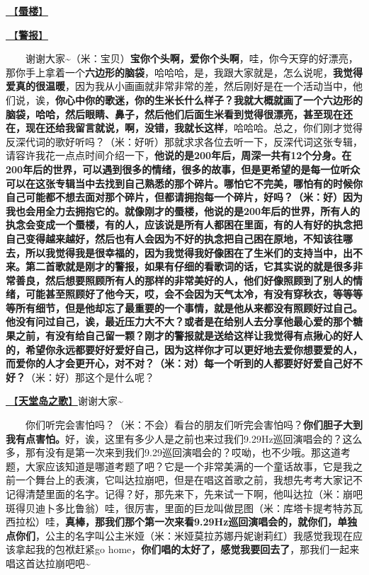 \documentclass[]{ctexbook}
\begin{document}
\hyperref[mirage]{🎵【\textbf{蜃楼}】}

\hyperref[the-giver]{🎵【\textbf{警报}】}

  谢谢大家\textasciitilde（米：宝贝）\textbf{宝你个头啊，爱你个头啊}，哇，你今天穿的好漂亮，那你手上拿着一个\textbf{六边形的脑袋}，哈哈哈，是，我跟大家就是，怎么说呢，\textbf{我觉得爱真的很温暖}，因为我从小画画就非常非常的差，然后刚好是在一个活动当中，他们说，诶，\textbf{你心中你的歌迷，你的生米长什么样子？我就大概就画了一个六边形的脑袋，哈哈，然后眼睛、鼻子，然后他们后面生米看到觉得很漂亮，甚至现在还在，现在还给我留言就说，啊，没错，我就长这样}，哈哈哈。总之，你们刚才觉得反深代词的歌好听吗？（米：好听）那就求求各位去听一下，反深代词这张专辑，请容许我花一点点时间介绍一下，\textbf{他说的是200年后，周深一共有12个分身。在200年后的世界，可以遇到很多的情绪，很多的故事，但是更希望的是每一位听众可以在这张专辑当中去找到自己熟悉的那个碎片。哪怕它不完美，哪怕有的时候你自己可能都不想去面对那个碎片，但都请拥抱每一个碎片，好吗？（米：好）因为我也会用全力去拥抱它的。就像刚才的蜃楼，他说的是200年后的世界，所有人的执念会变成一个蜃楼，有的人，应该说是所有人都困在里面，有的人有好的执念把自己变得越来越好，然后也有人会因为不好的执念把自己困在原地，不知该往哪去，所以我觉得我是很幸福的，因为我觉得我好像困在了生米们的支持当中，出不来。第二首歌就是刚才的警报，如果有仔细的看歌词的话，它其实说的就是很多非常善良，然后想要照顾所有人的那样的非常美好的人，他们好像照顾到了别人的情绪，可能甚至照顾好了他今天，哎，会不会因为天气太冷，有没有穿秋衣，等等等等所有细节，但是他却忘了最重要的一个事情，就是他从来都没有照顾好过自己。他没有问过自己，诶，最近压力大不大？或者是在给别人去分享他最心爱的那个糖果之前，有没有给自己留一颗？刚才的警报就是送给这样让我觉得有点揪心的好人的，希望你永远都要好好爱好自己，因为这样你才可以更好地去爱你想要爱的人，而爱你的人才会更开心，对不对？（米：对）每一个听到的人都要好好爱自己好不好？}（米：好）那这个是什么呢？

\hyperref[haven-song]{🎵【\textbf{天堂岛之歌}】}谢谢大家\textasciitilde{}

  你们听完会害怕吗？（米：不会）看台的朋友们听完会害怕吗？\textbf{你们胆子大到我有点害怕。}好，诶，这里有多少人是之前也来过我们9.29Hz巡回演唱会的？这么多，那有没有是第一次来到我们9.29巡回演唱会的？哎呦，也不少哦。那这道考题，大家应该知道是哪道考题了吧？它是一个非常美满的一个童话故事，它是我之前一个舞台上的表演，它叫达拉崩吧，但是在唱这首歌之前，我想先考考大家记不记得清楚里面的名字。记得？好，那先来下，先来试一下啊，他叫达拉（米：崩吧斑得贝迪卜多比鲁翁）哇，很厉害，里面的巨龙叫做昆图（米：库塔卡提考特苏瓦西拉松）哇，\textbf{真棒，那我们那个第一次来看9.29Hz巡回演唱会的，就你们，单独点你们}，公主的名字叫公主米娅（米：米娅莫拉苏娜丹妮谢莉红）我感觉我现在应该拿起我的包袱赶紧go home，\textbf{你们唱的太好了，感觉我要回去了}，那我们一起来唱这首达拉崩吧吧\textasciitilde{}
\end{document}
